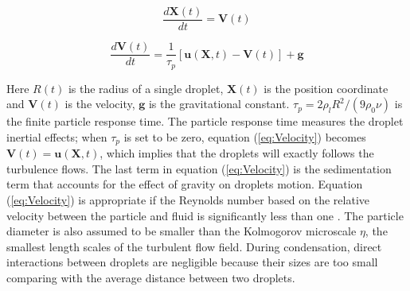 \documentclass[12pt]{article}
\begin{document}
\begin{equation}
\frac{d\mathbf{X}(t)}{dt}=\mathbf{V}(t)\label{eq:Coords}
\end{equation}


\begin{equation}
\frac{d\mathbf{V}(t)}{dt}=\frac{1}{\tau_{p}}[\mathbf{u}(\mathbf{X},t)-\mathbf{V}(t)]+\mathbf{g}\label{eq:Velocity}
\end{equation}


Here $R(t)$ is the radius of a single droplet, $\mathbf{X}(t)$ is the position
coordinate and $\mathbf{V}(t)$ is the velocity, $\mathbf{g}$ is the gravitational constant. $\tau_{p}=2\rho_{l}R^{2}/(9\rho_{0}\nu)$ is the finite
particle response time. The particle response time measures the droplet
inertial effects; when $\tau_{p}$ is set to be zero, equation (\ref{eq:Velocity}) becomes $\mathbf{V}(t)=\mathbf{u}(\mathbf{X},t)$, which implies that the droplets will exactly follows the turbulence flows. The last term in equation (\ref{eq:Velocity}) is the sedimentation term that accounts for the effect of gravity on droplets motion. Equation (\ref{eq:Velocity}) is appropriate if the Reynolds number based on the relative velocity between the particle and fluid is significantly less than one \cite{Eaton94}. The particle
diameter is also assumed to be smaller than the Kolmogorov microscale
$\eta$, the smallest length scales of the turbulent flow field. During
condensation, direct interactions between droplets are negligible because
their sizes are too small comparing with the average distance between
two droplets.
\end{document}

